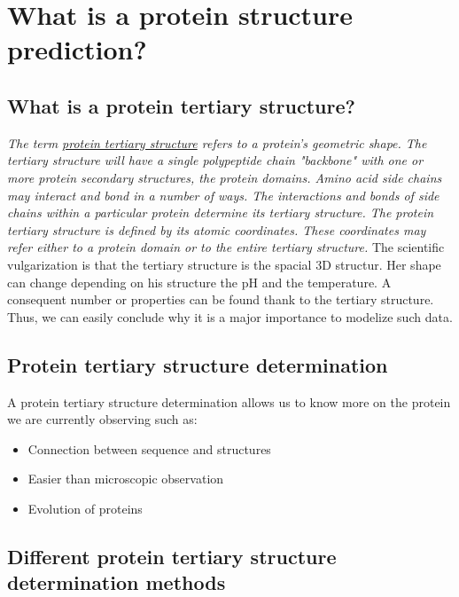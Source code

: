 \section{What is a protein structure prediction? }
\subsection{What is a protein tertiary structure? } 
\emph{The term \underline{protein tertiary structure} refers to a protein's geometric shape. The tertiary structure will have a single polypeptide chain "backbone" with one or more protein secondary structures, the protein domains. Amino acid side chains may interact and bond in a number of ways. The interactions and bonds of side chains within a particular protein determine its tertiary structure. The protein tertiary structure is defined by its atomic coordinates. These coordinates may refer either to a protein domain or to the entire tertiary structure.}
\newline \newline
The scientific vulgarization is that the tertiary structure is the spacial 3D structur. Her shape can change depending on his structure the pH and the temperature. A consequent number or properties can be found thank to the tertiary structure.
\newline
Thus, we can easily conclude why it is a major importance to modelize such data.


\subsection{Protein tertiary structure determination}

A protein tertiary structure determination allows us to know more on the protein we are currently observing such as:
\begin{itemize}
	\item Connection between sequence and structures
	\item  Easier than microscopic observation
	\item Evolution of proteins
\end{itemize}

\subsection{Different protein tertiary structure determination methods} 
